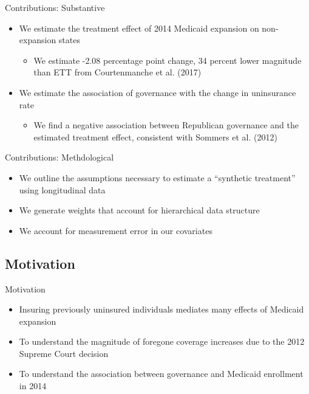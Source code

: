 \documentclass[hyperref={pdfpagelabels=false}]{beamer}
\begin{document}
\begin{frame}{Contributions: Substantive}
\begin{itemize}
    \item We estimate the treatment effect of 2014 Medicaid expansion on non-expansion states \bigskip
    
    \begin{itemize}
        \item We estimate -2.08 percentage point change, 34 percent lower magnitude than ETT from Courtenmanche et al. (2017) \bigskip 
    \end{itemize}

    \item We estimate the association of governance with the change in uninsurance rate \bigskip
    
    \begin{itemize}
        \item We find a negative association between Republican governance and the estimated treatment effect, consistent with Sommers et al. (2012) \bigskip 
    \end{itemize}
    \end{itemize}
\end{frame}

\begin{frame}{Contributions: Methdological}
\begin{itemize}
    \item We outline the assumptions necessary to estimate a ``synthetic treatment'' using longitudinal data \bigskip
    
    \item We generate weights that account for hierarchical data structure \bigskip
    
    \item We account for measurement error in our covariates \bigskip
    \end{itemize}
\end{frame}

\subsection{Motivation}

\begin{frame}{Motivation}

    \begin{itemize}
    
    \item Insuring previously uninsured individuals mediates many effects of Medicaid expansion \bigskip
    
    \item To understand the magnitude of foregone coverage increases due to the 2012 Supreme Court decision \bigskip
    
    \item To understand the association between governance and Medicaid enrollment in 2014 
    
    \end{itemize} 

\end{frame}
\end{document}
